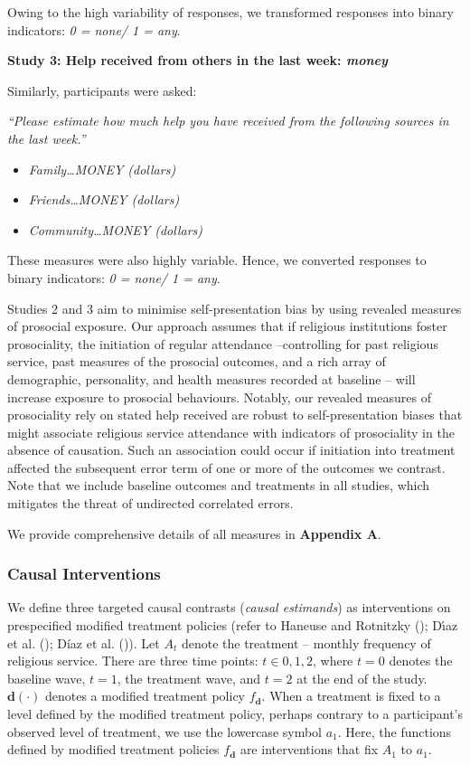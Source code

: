 \documentclass[
  single column]{article}
\providecommand{\tightlist}{%
  \setlength{\itemsep}{0pt}\setlength{\parskip}{0pt}}\usepackage{longtable,booktabs,array}
\begin{document}
Owing to the high variability of responses, we transformed responses
into binary indicators: \emph{0 = none/ 1 = any}.

\textbf{Study 3: Help received from others in the last week:
\emph{money} }

Similarly, participants were asked:

\emph{``Please estimate how much help you have received from the
following sources in the last week.''}

\begin{itemize}
\tightlist
\item
  \emph{Family\ldots MONEY (dollars)}
\item
  \emph{Friends\ldots MONEY (dollars)}
\item
  \emph{Community\ldots MONEY (dollars)}
\end{itemize}

These measures were also highly variable. Hence, we converted responses
to binary indicators: \emph{0 = none/ 1 = any}.

Studies 2 and 3 aim to minimise self-presentation bias by using revealed
measures of prosocial exposure. Our approach assumes that if religious
institutions foster prosociality, the initiation of regular attendance
--controlling for past religious service, past measures of the prosocial
outcomes, and a rich array of demographic, personality, and health
measures recorded at baseline -- will increase exposure to prosocial
behaviours. Notably, our revealed measures of prosociality rely on
stated help received are robust to self-presentation biases that might
associate religious service attendance with indicators of prosociality
in the absence of causation. Such an association could occur if
initiation into treatment affected the subsequent error term of one or
more of the outcomes we contrast. Note that we include baseline outcomes
and treatments in all studies, which mitigates the threat of undirected
correlated errors.

We provide comprehensive details of all measures in \textbf{Appendix A}.

\subsubsection{Causal Interventions}\label{causal-interventions}

We define three targeted causal contrasts (\emph{causal estimands}) as
interventions on prespecified modified treatment policies (refer to
Haneuse and Rotnitzky (); Dı́az
et al. (); Díaz et al.
()). Let \(A_t\) denote the treatment
-- monthly frequency of religious service. There are three time points:
\(t\in{0,1,2}\), where \(t=0\) denotes the baseline wave, \(t=1\), the
treatment wave, and \(t=2\) at the end of the study.
\(\mathbf{d}(\cdot)\) denotes a modified treatment policy
\(f_\mathbf{d}\). When a treatment is fixed to a level defined by the
modified treatment policy, perhaps contrary to a participant's observed
level of treatment, we use the lowercase symbol \(a_1\). Here, the
functions defined by modified treatment policies \(f_\mathbf{d}\) are
interventions that fix \(A_1\) to \(a_1\).
\end{document}
